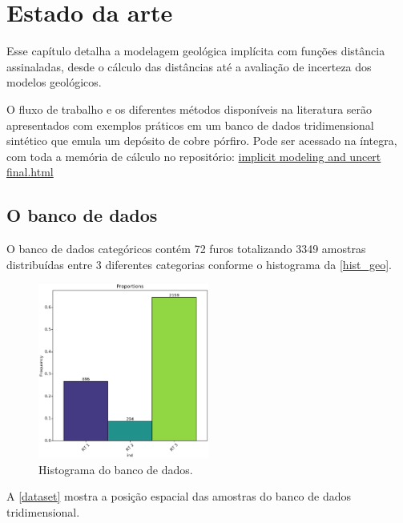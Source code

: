 \chapter{Estado da arte} \label{capitulo_2}

Esse capítulo detalha a modelagem geológica implícita com funções distância assinaladas, desde o cálculo das distâncias até a avaliação de incerteza dos modelos geológicos.

O fluxo de trabalho e os diferentes métodos disponíveis na literatura serão apresentados com exemplos práticos em um banco de dados tridimensional sintético que emula um depósito de cobre pórfiro. Pode ser acessado na íntegra, com toda a memória de cálculo no repositório: \href{https://drive.google.com/open?id=1JLRrOtOzDVCEpqnG8Ik95xws7Dw6MBvJ}{implicit modeling and uncert final.html}

\section{O banco de dados}

O banco de dados categóricos contém 72 furos totalizando 3349 amostras distribuídas entre 3 diferentes categorias conforme o histograma da \autoref{hist_geo}.

\begin{figure}[H]
	\caption{\label{hist_geo}Histograma do banco de dados.}
	\begin{center}
		\includegraphics[width=0.5\textwidth]{capitulo_2/prop_hist_big.png}
	\end{center}
\end{figure}

A \autoref{dataset} mostra a posição espacial das amostras do banco de dados tridimensional.

